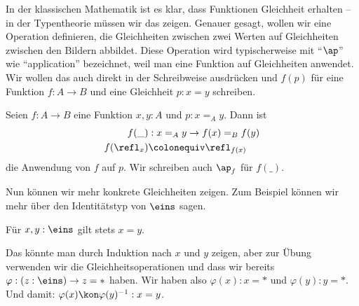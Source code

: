 In der klassischen Mathematik ist es klar, dass Funktionen Gleichheit erhalten -- in der Typentheorie müssen wir das zeigen.
Genauer gesagt, wollen wir eine Operation definieren, die Gleichheiten zwischen zwei Werten auf Gleichheiten zwischen den Bildern abbildet.
Diese Operation wird typischerweise mit ``$\ap$'' wie ``application'' bezeichnet, weil man eine Funktion auf Gleichheiten anwendet. 
Wir wollen das auch direkt in der Schreibweise ausdrücken und $f( p)$ für eine Funktion $f:A\to B$ und eine Gleichheit $ p:x=y$ schreiben.

\begin{definition}
  Seien $f:A\to B$ eine Funktion $x,y:A$ und $ p:x=_Ay$.
  Dann ist
  \begin{align*}
    f(\_) &: x=_Ay\to f(x)=_Bf(y) \\
    f(\refl_x)&\colonequiv \refl_{f(x)}
  \end{align*}
  die Anwendung von $f$ auf $ p$. Wir schreiben auch $\ap_f$ für $f(\_)$.
\end{definition}

Nun können wir mehr konkrete Gleichheiten zeigen.
Zum Beispiel können wir mehr über den Identitätstyp von $\eins$ sagen.

\begin{lemma}
  Für $x,y:\eins$ gilt stets $x=y$.  
\end{lemma}
\begin{beweis}
 Das könnte man durch Induktion nach $x$ und $y$ zeigen,
 aber zur Übung verwenden wir die Gleichheitsoperationen und dass wir bereits $\varphi:(z:\eins)\to z=\ast$ haben.
 Wir haben also $\varphi(x):x=\ast$ und $\varphi(y):y=\ast$.
 Und damit: $\varphi(x)\kon\varphi(y)^{-1}:x=y$.
\end{beweis}

